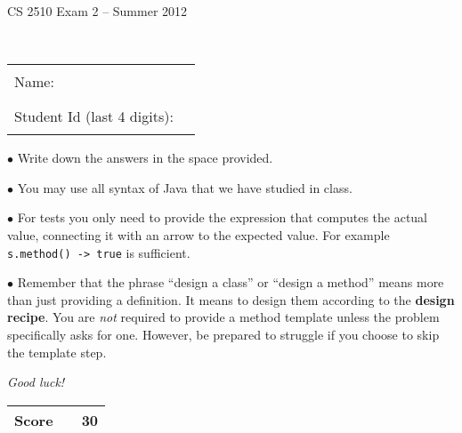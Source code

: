 \documentclass[11pt]{article}
\newcommand\code[1]{\texttt{#1}}
\newcounter{Pctr}
\begin{document}
\renewcommand{\theenumi}{\Alph{enumi}}
\setcounter{Pctr}{0}


\vfill
\centerline{\Large CS 2510 Exam 2 -- Summer 2012}

~\\[2cm]

\begin{center}
\begin{tabular}{l@{\qquad}l}
Name:                        & \rule{200pt}{.1pt} \\[.5cm]
Student Id (last 4 digits):  & \rule{200pt}{.1pt} \\[.5cm]
\end{tabular}
\end{center}

\noindent\begin{minipage}{7.5cm} $\bullet$ Write down the answers in the
space provided. 

$\bullet$ You may use all syntax of Java that we have studied in
class.

$\bullet$ For tests you only need to provide the expression that
computes the actual value, connecting it with an arrow to the expected
value. For example \code{s.method() -> true} is sufficient.

$\bullet$ Remember that the phrase ``design a class'' or ``design a
method'' means more than just providing a definition. It means to
design them according to the \textbf{design recipe}.  You are
\textit{not} required to provide a method template unless the problem
specifically asks for one.  However, be prepared to struggle if you
choose to skip the template step.

\bigskip

\textit{Good luck!}
\end{minipage}\hfil\begin{minipage}[t]{4.5cm}
\begin{tabular}{|c|l@{\qquad\qquad}|r|}
\hline
\textbf{Score} &  & 30 \\ \hline
\end{tabular}
\end{minipage}

\vfill\thispagestyle{empty}
\newpage
\end{document}
